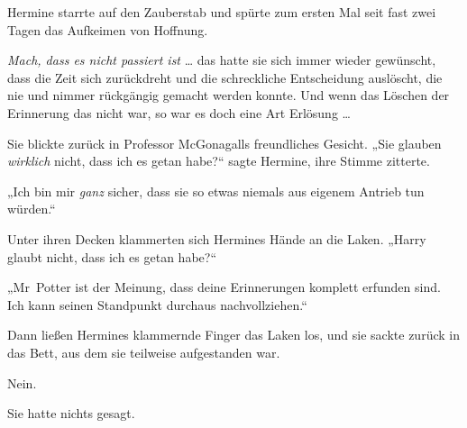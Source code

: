 Hermine starrte auf den Zauberstab und spürte zum ersten Mal seit fast zwei Tagen das Aufkeimen von Hoffnung.

\emph{Mach, dass es nicht passiert ist} … das hatte sie sich immer wieder gewünscht, dass die Zeit sich zurückdreht und die schreckliche Entscheidung auslöscht, die nie und nimmer rückgängig gemacht werden konnte. Und wenn das Löschen der Erinnerung das nicht war, so war es doch eine Art Erlösung …


Sie blickte zurück in Professor McGonagalls freundliches Gesicht.
„Sie glauben \emph{wirklich} nicht, dass ich es getan habe?“ sagte Hermine, ihre Stimme zitterte.

„Ich bin mir \emph{ganz} sicher, dass sie so etwas niemals aus eigenem Antrieb tun würden.“

Unter ihren Decken klammerten sich Hermines Hände an die Laken.
„Harry glaubt nicht, dass ich es getan habe?“

„Mr~Potter ist der Meinung, dass deine Erinnerungen komplett erfunden sind. Ich kann seinen Standpunkt durchaus nachvollziehen.“

Dann ließen Hermines klammernde Finger das Laken los, und sie sackte zurück in das Bett, aus dem sie teilweise aufgestanden war.

Nein.

Sie hatte nichts gesagt.

